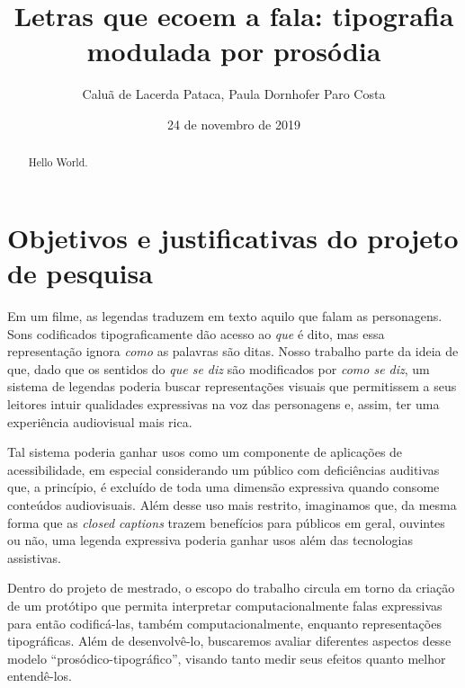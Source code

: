 \documentclass{tufte-handout}
\title{Letras que ecoem a fala: tipografia modulada por prosódia}
\author{Caluã de Lacerda Pataca, Paula Dornhofer Paro Costa}
\date{24 de novembro de 2019}  %
\begin{document}
\maketitle%

\begin{abstract}
\noindent Hello World.
\end{abstract}


\section{Objetivos e justificativas do projeto de pesquisa}\label{sec:objetivos}

Em um filme, as legendas traduzem em texto aquilo que falam as personagens. Sons codificados tipograficamente dão acesso ao \textit{que} é dito, mas essa representação ignora \textit{como} as palavras são ditas. Nosso trabalho parte da ideia de que, dado que os sentidos do \textit{que se diz} são modificados por \textit{como se diz}, um sistema de legendas poderia buscar representações visuais que permitissem a seus leitores intuir qualidades expressivas na voz das personagens e, assim, ter uma experiência audiovisual mais rica.

Tal sistema poderia ganhar usos como um componente de aplicações de acessibilidade, em especial considerando um público com deficiências auditivas que, a princípio, é excluído de toda uma dimensão expressiva quando consome conteúdos audiovisuais. Além desse uso mais restrito, imaginamos que, da mesma forma que as \textit{closed captions} trazem benefícios para públicos em geral, ouvintes ou não, uma legenda expressiva poderia ganhar usos além das tecnologias assistivas. 

Dentro do projeto de mestrado, o escopo do trabalho circula em torno da criação de um protótipo que permita interpretar computacionalmente falas expressivas para então codificá-las, também computacionalmente, enquanto representações tipográficas. Além de desenvolvê-lo, buscaremos avaliar diferentes aspectos desse modelo ``prosódico-tipográfico'', visando tanto medir seus efeitos quanto melhor entendê-los.
\end{document}
